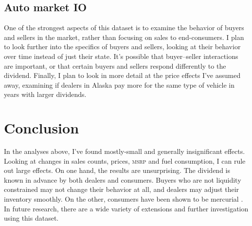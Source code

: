 \documentclass[11pt,letterpaper,oneside]{article}
\newcommand{\msrp}{\textsc{msrp}}
\newcommand{\vin}{\textsc{vin}}
\begin{document}
\begin{doublespacing}
\subsection{Auto market IO}
One of the strongest aspects of this dataset is to examine the behavior of buyers and sellers in the market, rather than focusing on sales to end-consumers.
I plan to look further into the specifics of buyers and sellers, looking at their behavior over time instead of just their state.
It's possible that buyer--seller interactions are important, or that certain buyers and sellers respond differently to the dividend.
Finally, I plan to look in more detail at the price effects I've assumed away, examining if dealers in Alaska pay more for the same type of vehicle in years with larger dividends.
%
%


\section{Conclusion}

In the analyses above, I've found mostly\hyp{}small and generally insignificant effects.
Looking at changes in sales counts, prices, \msrp{} and fuel consumption, I can rule out large effects.
On one hand,  the results are unsurprising.
The dividend is known in advance by both dealers and consumers.
Buyers who are not liquidity constrained may not change their behavior at all, and dealers may adjust their inventory smoothly.
On the other, consumers have been shown to be mercurial \parencite{Busse2015_weather_on_cars}.
In future research, there are a wide variety of extensions and further investigation using this dataset.

%
%


\end{doublespacing}
\end{document}
